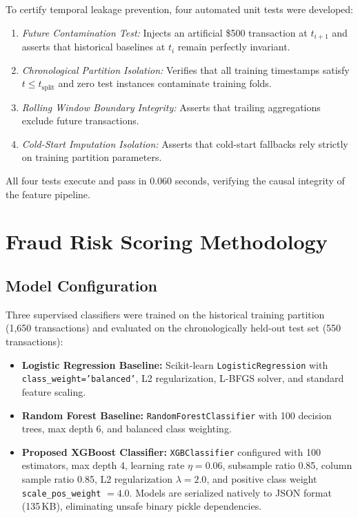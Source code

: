 \documentclass[conference]{IEEEtran}
\begin{document}
To certify temporal leakage prevention, four automated unit tests were developed:
\begin{enumerate}
    \item \textit{Future Contamination Test:} Injects an artificial \$500 transaction at $t_{i+1}$ and asserts that historical baselines at $t_i$ remain perfectly invariant.
    \item \textit{Chronological Partition Isolation:} Verifies that all training timestamps satisfy $t \le t_{\text{split}}$ and zero test instances contaminate training folds.
    \item \textit{Rolling Window Boundary Integrity:} Asserts that trailing aggregations exclude future transactions.
    \item \textit{Cold-Start Imputation Isolation:} Asserts that cold-start fallbacks rely strictly on training partition parameters.
\end{enumerate}
All four tests execute and pass in 0.060 seconds, verifying the causal integrity of the feature pipeline.

\section{Fraud Risk Scoring Methodology}

\subsection{Model Configuration}
Three supervised classifiers were trained on the historical training partition (1,650 transactions) and evaluated on the chronologically held-out test set (550 transactions):
\begin{itemize}
    \item \textbf{Logistic Regression Baseline:} Scikit-learn \texttt{LogisticRegression} with \texttt{class\_weight='balanced'}, L2 regularization, L-BFGS solver, and standard feature scaling.
    \item \textbf{Random Forest Baseline:} \texttt{RandomForestClassifier} with 100 decision trees, max depth 6, and balanced class weighting.
    \item \textbf{Proposed XGBoost Classifier:} \texttt{XGBClassifier} configured with 100 estimators, max depth 4, learning rate $\eta = 0.06$, subsample ratio 0.85, column sample ratio 0.85, L2 regularization $\lambda = 2.0$, and positive class weight \texttt{scale\_pos\_weight} $= 4.0$. Models are serialized natively to JSON format (135\,KB), eliminating unsafe binary pickle dependencies.
\end{itemize}
\end{document}
